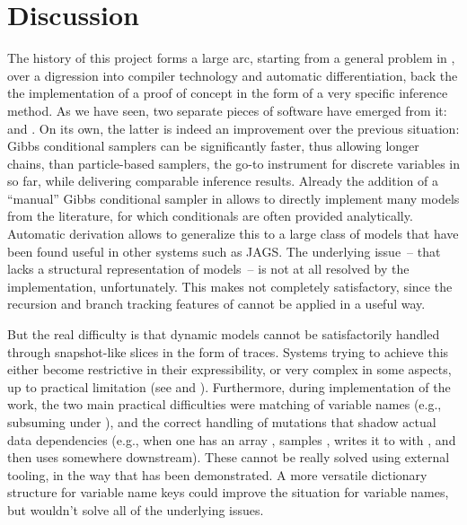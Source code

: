 \chapter{Discussion}
\label{cha:discussion}

The history of this project forms a large arc, starting from a general problem in \turingjl{}, over
a digression into compiler technology and automatic differentiation, back the the implementation of
a proof of concept in the form of a very specific inference method.  As we have seen, two separate
pieces of software have emerged from it: \irtrackerjl{} and \autogibbsjl{}.  On its own, the latter
is indeed an improvement over the previous situation: Gibbs conditional samplers can be
significantly faster, thus allowing longer chains, than particle-based samplers, the go-to
instrument for discrete variables in \turingjl{} so far, while delivering comparable inference
results.  Already the addition of a \enquote{manual} Gibbs conditional sampler in \turingjl{} allows
to directly implement many models from the literature, for which conditionals are often provided
analytically.  Automatic derivation allows to generalize this to a large class of models that have
been found useful in other systems such as JAGS.  The underlying issue~-- that \turingjl{} lacks a
structural representation of models~-- is not at all resolved by the implementation, unfortunately.
This makes \autogibbsjl{} not completely satisfactory, since the recursion and branch tracking
features of \irtrackerjl{} cannot be applied in a useful way.

But the real difficulty is that dynamic models cannot be satisfactorily handled through
snapshot-like slices in the form of traces.  Systems trying to achieve this either become
restrictive in their expressibility, or very complex in some aspects, up to practical limitation
(see \textcite{mansinghka2014venture} and \textcite{goodman2012church}).  Furthermore, during
implementation of the work, the two main practical difficulties were matching of variable names
(e.g., subsuming  under ), and the correct handling of mutations
that shadow actual data dependencies (e.g., when one has an array , samples ,
writes it to  with , and then uses  somewhere
downstream).  These cannot be really solved using external tooling, in the way that has been
demonstrated.  A more versatile dictionary structure for variable name keys could improve the
situation for variable names, but wouldn't solve all of the underlying issues.

